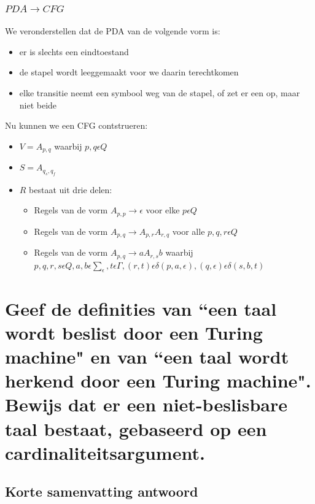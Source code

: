 \documentclass{article}
\begin{document}
        \subsubsection{$PDA \rightarrow CFG$}
            We veronderstellen dat de PDA van de volgende vorm is:
            \begin{itemize}
                \item er is slechts een eindtoestand
                \item de stapel wordt leeggemaakt voor we daarin terechtkomen
                \item elke transitie neemt een symbool weg van de stapel, of zet er een op, maar niet beide
            \end{itemize}
            Nu kunnen we een CFG contstrueren:
            \begin{itemize}
                \item $V  = A_{p,q}$ waarbij $ p,q\epsilon Q$
                \item $S = A_{q_s, q_f}$
                \item $R$ bestaat uit drie delen:
                \begin{itemize}
                    \item Regels van de vorm $A_{p,p} \rightarrow \epsilon$ voor elke $p \epsilon Q$
                    \item Regels van de vorm $A_{p,q} \rightarrow A_{p,r}A_{r,q}$ voor alle $p,q,r \epsilon Q$
                    \item Regels van de vorm $A_{p,q} \rightarrow aA_{r,s}b$ waarbij $p,q,r,s \epsilon Q, a,b \epsilon \sum_\epsilon, t \epsilon \Gamma, (r,t) \epsilon \delta(p,a,\epsilon), (q,\epsilon) \epsilon \delta(s,b,t)$
                \end{itemize}
            \end{itemize}

\newpage
\section{Geef de definities van ``een taal wordt beslist door een Turing machine" en van ``een taal wordt herkend door een Turing machine". Bewijs dat er een niet-beslisbare taal bestaat, gebaseerd op een cardinaliteitsargument.}
    \subsection{Korte samenvatting antwoord}
\end{document}

